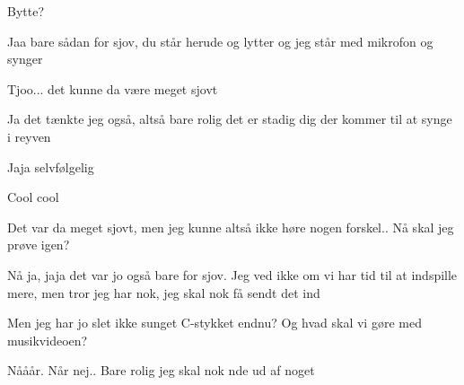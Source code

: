 \documentclass[a4paper,11pt]{article}
\begin{document}
\begin{sketch}
  Bytte?

 Jaa bare sådan for sjov, du står herude og lytter og jeg står med mikrofon og synger

 Tjoo... det kunne da være meget sjovt

 Ja det tænkte jeg også, altså bare rolig det er stadig dig der kommer til at synge i reyven

 Jaja selvfølgelig

 Cool cool



 Det var da meget sjovt, men jeg kunne altså ikke høre nogen forskel.. Nå skal jeg prøve igen?

 Nå ja, jaja det var jo også bare for sjov. Jeg ved ikke om vi har tid til at indspille mere, men tror jeg har nok, jeg skal nok få sendt det ind

 Men jeg har jo slet ikke sunget C-stykket endnu? Og hvad skal vi gøre med musikvideoen?

 Nååår. Når nej.. Bare rolig jeg skal nok nde ud af noget

\end{sketch}
\end{document}
